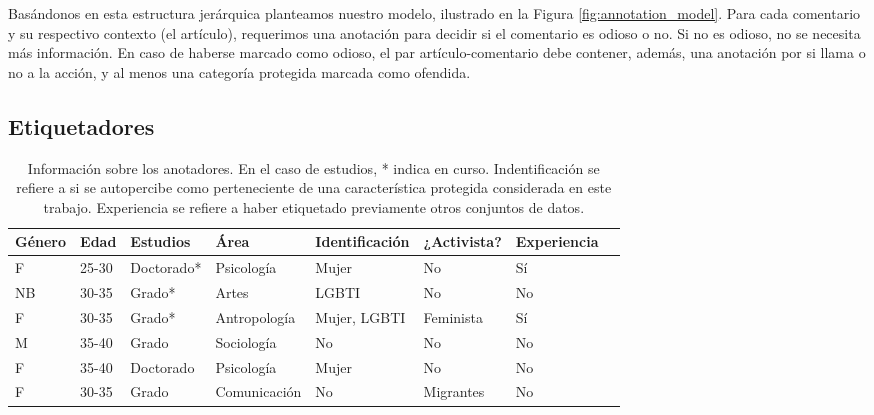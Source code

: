 Basándonos en esta estructura jerárquica planteamos nuestro modelo, ilustrado en la Figura \ref{fig:annotation_model}. Para cada comentario y su respectivo contexto (el artículo), requerimos una anotación para decidir si el comentario es odioso o no. Si no es odioso, no se necesita más información. En caso de haberse marcado como odioso, el par artículo-comentario debe contener, además, una anotación por si llama o no a la acción, y al menos una categoría protegida marcada como ofendida.


\subsection{Etiquetadores}

%
%

\begin{table}[b]
    \centering
    \small
    \begin{tabularx}{\textwidth}{l l l l l l l l}
        Género& Edad  & Estudios    & Área          & Identificación    & ¿Activista?   & Experiencia\\
        \hline
        F    & 25-30  & Doctorado*  & Psicología    & Mujer             & No                   & Sí         \\
        NB   & 30-35  & Grado*      & Artes         & LGBTI             & No                   & No         \\
        F    & 30-35  & Grado*      & Antropología  & Mujer, LGBTI      & Feminista            & Sí         \\
        M    & 35-40  & Grado       & Sociología    & No                & No                   & No         \\
        F    & 35-40  & Doctorado   & Psicología    & Mujer             & No                   & No         \\
        F    & 30-35  & Grado       & Comunicación  & No                & Migrantes            & No         \\
        \hline
    \end{tabularx}
    \caption{Información sobre los anotadores. En el caso de estudios, * indica en curso. Indentificación se refiere a si se autopercibe como perteneciente de una característica protegida considerada en este trabajo. Experiencia se refiere a haber etiquetado previamente otros conjuntos de datos. }
    \label{tab:informacion_sobre_anotadores}
\end{table}

